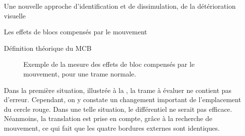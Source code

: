 \begin{chapter}{Une nouvelle approche d'identification et de dissimulation, de
la détérioration visuelle}
\begin{section}{Les effets de blocs compensés par le mouvement}
\begin{subsection}{Définition théorique du MCB}
\begin{figure}
{{			
		}
	}
	\caption[Exemple du MCB pour une trame normale] {Exemple de la mesure des effets
de bloc compensés par le mouvement, pour une trame normale.}
	\label{fig-Good}
\end{figure}

Dans la première situation, illustrée à la , la trame à évaluer ne
contient pas d'erreur. Cependant, on y constate un changement important de
l'emplacement du cercle rouge. Dans une telle situation, le différentiel ne
serait pas efficace. Néanmoins, la translation est prise en compte, grâce à la
recherche de mouvement, ce qui fait que les quatre bordures externes sont
identiques.


\end{subsection}
\end{section}
\end{chapter}

